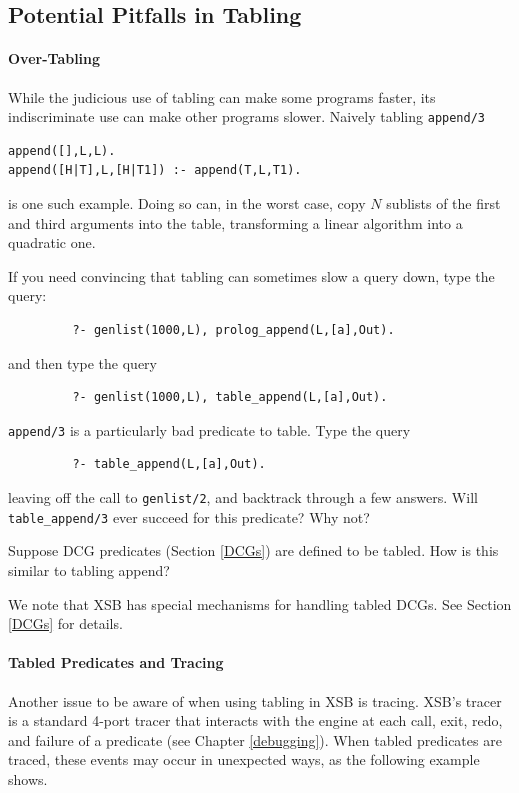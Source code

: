 
\subsection{Potential Pitfalls in Tabling}
\label{sec:TablingPitfalls}

\paragraph{Over-Tabling}
While the judicious use of tabling can make some programs faster, its
indiscriminate use can make other programs slower.  Naively tabling
{\tt append/3}
\begin{center}
\begin{minipage}{3.5in}
\begin{verbatim}
append([],L,L).
append([H|T],L,[H|T1]) :- append(T,L,T1).
\end{verbatim}						       
\end{minipage}
\end{center}
is one such example.  Doing so can, in the worst case, copy $N$
sublists of the first and third arguments into the table, transforming
a linear algorithm into a quadratic one.

\begin{exercise} \label{ex:append}
If you need convincing that tabling can sometimes slow a query down,
type the query:
\begin{verbatim}
         ?- genlist(1000,L), prolog_append(L,[a],Out).
\end{verbatim}
and then type the query
\begin{verbatim}
         ?- genlist(1000,L), table_append(L,[a],Out).
\end{verbatim}
{\tt append/3} is a particularly bad predicate to table.  Type the query
\begin{verbatim}
         ?- table_append(L,[a],Out).
\end{verbatim}
leaving off the call to {\tt genlist/2}, and backtrack through a few answers.
Will {\tt table\_append/3} ever succeed for this predicate?  Why not?

Suppose DCG predicates (Section \ref{DCGs}) are defined to be tabled.
How is this similar to tabling append?\fillBox
\end{exercise}
%
We note that XSB has special mechanisms for handling tabled DCGs.  See
Section \ref{DCGs} for details.

\paragraph{Tabled Predicates and Tracing}
Another issue to be aware of when using tabling in XSB is tracing.
XSB's tracer is a standard 4-port tracer that interacts with the
engine at each call, exit, redo, and failure of a predicate (see
Chapter \ref{debugging}).  When tabled predicates are traced, these
events may occur in unexpected ways, as the following example shows.

